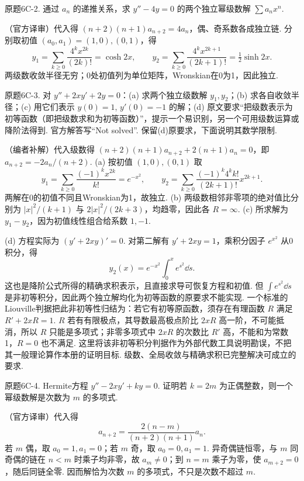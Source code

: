 \begin{exercise}\label{cw:bank-6C-2}原题6C-2. 通过 $a_n$ 的递推关系，求 $y''-4y=0$ 的两个独立幂级数解 $\sum a_nx^n$.\end{exercise}
\begin{solution}（官方译审）代入得 $(n+2)(n+1)a_{n+2}=4a_n$，偶、奇系数各成独立链. 分别取初值 $(a_0,a_1)=(1,0),(0,1)$，得
\[y_1=\sum_{k\ge0}\frac{4^kx^{2k}}{(2k)!}=\cosh2x,
\qquad y_2=\sum_{k\ge0}\frac{4^kx^{2k+1}}{(2k+1)!}=\tfrac12\sinh2x.\]
两级数收敛半径无穷；0处初值列为单位矩阵，Wronskian在0为1，因此独立.\end{solution}
\begin{exercise}\label{cw:bank-6C-3}原题6C-3. 对 $y''+2xy'+2y=0$：(a) 求两个独立级数解 $y_1,y_2$；(b) 求各自收敛半径；(c) 用它们表示 $y(0)=1$, $y'(0)=-1$ 的解；(d) 原文要求“把级数表示为初等函数（即把级数求和为初等函数）”，提示一个易识别，另一个可用级数运算或降阶法得到. 官方解答写“Not solved”. 保留(d)原要求，下面说明其数学限制.\end{exercise}
\begin{solution}（编者补解）代入级数得 $(n+2)(n+1)a_{n+2}+2(n+1)a_n=0$，即 $a_{n+2}=-2a_n/(n+2)$. (a) 按初值 $(1,0),(0,1)$ 取
\[y_1=\sum_{k\ge0}\frac{(-1)^kx^{2k}}{k!}=e^{-x^2},\qquad
 y_2=\sum_{k\ge0}\frac{(-1)^k4^kk!}{(2k+1)!}x^{2k+1}.
\]
两解在0的初值不同且Wronskian为1，故独立. (b) 两级数相邻非零项的绝对值比分别为 $|x|^2/(k+1)$ 与 $2|x|^2/(2k+3)$，均趋零，因此各 $R=\infty$. (c) 所求解为 $y_1-y_2$，因为初值线性组合给系数 $1,-1$.

(d) 方程实际为 $(y'+2xy)'=0$. 对第二解有 $y'+2xy=1$，乘积分因子 $e^{x^2}$ 从0积分，得
\[y_2(x)=e^{-x^2}\int_0^x e^{s^2}\dd s.\]
这也是降阶公式所得的精确求积表示，且直接求导可恢复方程和初值. 但 $\int e^{s^2}\dd s$ 是非初等积分，因此两个独立解均化为初等函数的原要求不能实现. 一个标准的Liouville判据把此非初等性归结为：若它有初等原函数，须存在有理函数 $R$ 满足 $R'+2xR=1$. $R$ 若有有限极点，其导数最高极点阶比 $2xR$ 高一阶，不可能抵消，所以 $R$ 只能是多项式；非零多项式中 $2xR$ 的次数比 $R'$ 高，不能和为常数1，$R=0$ 也不满足. 这里将该非初等积分判据作为外部代数工具说明勘误，不把其一般理论算作本册的证明目标. 级数、全局收敛与精确求积已完整解决可成立的要求.\end{solution}
\begin{exercise}\label{cw:bank-6C-4}原题6C-4. Hermite方程 $y''-2xy'+ky=0$. 证明若 $k=2m$ 为正偶整数，则一个幂级数解是次数为 $m$ 的多项式.\end{exercise}
\begin{solution}（官方译审）代入得
\[a_{n+2}=\frac{2(n-m)}{(n+2)(n+1)}a_n.
\]
若 $m$ 偶，取 $a_0=1,a_1=0$；若 $m$ 奇，取 $a_0=0,a_1=1$. 异奇偶链恒零，与 $m$ 同奇偶的链在 $n<m$ 时乘子均非零，故 $a_m\ne0$；到 $n=m$ 乘子为零，使 $a_{m+2}=0$，随后同链全零. 因而解恰为次数 $m$ 的多项式，不只是次数不超过 $m$.\end{solution}
